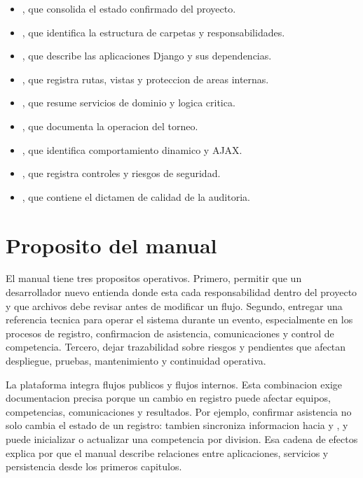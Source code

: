 \begin{itemize}
  \item {}, que consolida el estado confirmado del proyecto.
  \item {}, que identifica la estructura de carpetas y responsabilidades.
  \item {}, que describe las aplicaciones Django y sus dependencias.
  \item {}, que registra rutas, vistas y proteccion de areas internas.
  \item {}, que resume servicios de dominio y logica critica.
  \item {}, que documenta la operacion del torneo.
  \item {}, que identifica comportamiento dinamico y AJAX.
  \item {}, que registra controles y riesgos de seguridad.
  \item {}, que contiene el dictamen de calidad de la auditoria.
\end{itemize}

\section{Proposito del manual}
\label{sec:introduccion-proposito}

El manual tiene tres propositos operativos. Primero, permitir que un desarrollador nuevo entienda donde esta cada responsabilidad dentro del proyecto y que archivos debe revisar antes de modificar un flujo. Segundo, entregar una referencia tecnica para operar el sistema durante un evento, especialmente en los procesos de registro, confirmacion de asistencia, comunicaciones y control de competencia. Tercero, dejar trazabilidad sobre riesgos y pendientes que afectan despliegue, pruebas, mantenimiento y continuidad operativa.

La plataforma integra flujos publicos y flujos internos. Esta combinacion exige documentacion precisa porque un cambio en registro puede afectar equipos, competencias, comunicaciones y resultados. Por ejemplo, confirmar asistencia no solo cambia el estado de un registro: tambien sincroniza informacion hacia  y , y puede inicializar o actualizar una competencia por division. Esa cadena de efectos explica por que el manual describe relaciones entre aplicaciones, servicios y persistencia desde los primeros capitulos.


